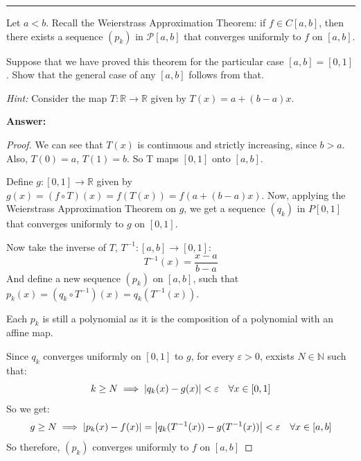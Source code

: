\documentclass[11pt]{article}
\newcounter{problem}
\newenvironment{problem}{%
    \newpage
    \refstepcounter{problem}%
    \Needspace{7\baselineskip}%
    \par\vspace{0.7em}%
    \noindent\textcolor{courseblue}{\rule{\textwidth}{0.4pt}}%
    \par\vspace{0.5em}%
    \begin{list}{}{%
        \setlength{\leftmargin}{2.3em}%
        \setlength{\labelwidth}{1.8em}%
        \setlength{\labelsep}{0.5em}%
        \setlength{\topsep}{0pt}%
        \setlength{\partopsep}{0pt}%
    }%
    \item[{[\theproblem]}]
}{%
    \end{list}
    \par\vspace{0.5em}
}
\newenvironment{answer}{%
    \Needspace{4\baselineskip}%
    \par\vspace{0.35em}
    \noindent\textbf{Answer:}\par
}{%
    \par\vspace{0.25em}
}
\begin{document}
\begin{problem}
Let $a<b$. Recall the Weierstrass Approximation Theorem: if $f\in C[a,b]$,
then there exists a sequence $(p_k)$ in $\mathcal{P}[a,b]$ that converges
uniformly to $f$ on $[a,b]$.

Suppose that we have proved this theorem for the particular case
$[a,b]=[0,1]$. Show that the general case of any $[a,b]$ follows from that.

\emph{Hint:} Consider the map $T:\mathbb{R}\to\mathbb{R}$ given by
$T(x)=a+(b-a)x$.
\begin{answer}
    \begin{proof}
        We can see that $T(x)$ is continuous and strictly increasing, since $b > a$. Also, $T(0) = a$, $T(1) = b$. So T maps $[0,1]$ onto $[a,b]$.

        Define $g: [0,1]\to\mathbb{R}$ given by $g(x) = (f\circ T)(x) = f(T(x)) = f(a + (b - a)x)$.
        Now, applying the Weierstrass Approximation Theorem on $g$, we get a sequence $(q_k)$ in $P[0,1]$ that converges uniformly to $g$ on $[0,1]$.

        Now take the inverse of $T$, $T^{-1}: [a,b]\to [0,1]$:
        \[T^{-1}(x) = \frac{x - a}{b - a}\]
        And define a new sequence $(p_k)$ on $[a,b]$, such that $p_k(x) = (q_k\circ T^{-1})(x) = q_k(T^{-1}(x))$.
        
        Each $p_k$ is still a polynomial as it is the composition of a polynomial with an affine map.

        Since $q_k$ converges uniformly on $[0,1]$ to $g$, for every $\varepsilon > 0$, exxists $N \in\mathbb{N}$ such that:
        \[k \geq N \implies \abs{q_k(x) - g(x)} < \varepsilon \quad \forall x\in[0,1]\]
        So we get:
        \[g\geq N \implies \abs{p_k(x) - f(x)} = \abs{q_k(T^{-1}(x)) - g(T^{-1}(x))} < \varepsilon  \quad \forall x\in[a,b]\]
        So therefore, $(p_k)$ converges uniformly to $f$ on $[a,b]$ 
    \end{proof}
\end{answer}
\end{problem}
\end{document}

